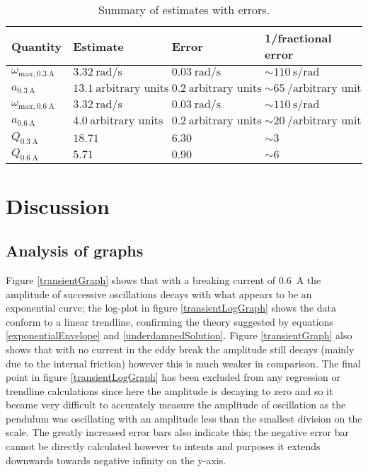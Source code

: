 \documentclass[12pt]{article}
\begin{document}
\begin{table}[H]
    \centering
    \begin{tabular}{| p{2cm} | p{4cm} | p{4cm} | p{4cm} |}
    \hline
    Quantity & Estimate & Error & 1/fractional error \\ \hline
    $\omega_{\text{max},\SI{0.3}{\ampere}}$ & $\SI{3.32}{\radian\per\second}$ & $\SI{0.03}{\radian\per\second}$ & $\sim\SI{110}{\second\per\radian}$ \\ \hline
    $a_{\SI{0.3}{\ampere}}$ & $\SI{13.1}{\text{arbitrary units}}$ & $\SI{0.2}{\text{arbitrary units}}$ & $\sim\SI{65}{\per\text{arbitrary unit}}$ \\ \hline
    $\omega_{\text{max},\SI{0.6}{\ampere}}$ & $\SI{3.32}{\radian\per\second}$ & $\SI{0.03}{\radian\per\second}$ & $\sim\SI{110}{\second\per\radian}$ \\ \hline
    $a_{\SI{0.6}{\ampere}}$ & $\SI{4.0}{\text{arbitrary units}}$ & $\SI{0.2}{\text{arbitrary units}}$ & $\sim\SI{20}{\per\text{arbitrary unit}}$ \\ \hline
    $Q_{\SI{0.3}{\ampere}}$ & $\SI{18.71}{}$ & $\SI{6.30}{}$ & $\sim\SI{3}{}$ \\ \hline
    $Q_{\SI{0.6}{\ampere}}$ & $\SI{5.71}{}$ & $\SI{0.90}{}$ & $\sim\SI{6}{}$ \\ \hline
    \end{tabular}
    \caption{Summary of estimates with errors.}
    \label{estimateTable}
\end{table}

\section{Discussion}
\subsection{Analysis of graphs}
Figure \ref{transientGraph} shows that with a breaking current of \SI{0.6}{\ampere} the amplitude of successive oscillations decays with what appears to be an exponential curve; the log-plot in figure \ref{transientLogGraph} shows the data conform to a linear trendline, confirming the theory suggested by equations \ref{exponentialEnvelope} and \ref{underdampedSolution}. Figure \ref{transientGraph} also shows that with no current in the eddy break the amplitude still decays (mainly due to the internal friction) however this is much weaker in comparison. The final point in figure \ref{transientLogGraph} has been excluded from any regression or trendline calculations since here the amplitude is decaying to zero and so it became very difficult to accurately measure the amplitude of oscillation as the pendulum was oscillating with an amplitude less than the smallest division on the scale. The greatly increased error bars also indicate this; the negative error bar cannot be directly calculated however to intents and purposes it extends downwards towards negative infinity on the y-axis.
\end{document}
